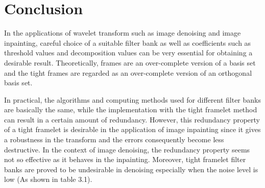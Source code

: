 
\chapter{Conclusion} %

\label{SectionX} %



In the applications of wavelet transform such as image denoising and image inpainting, careful choice of a suitable filter bank as well as coefficients such as threshold values and decomposition values can be very essential for obtaining a desirable result. Theoretically, frames are an over-complete version of a basis set and the tight frames are regarded as an over-complete version of an orthogonal basis set. 

In practical, the algorithms and computing methods used for different filter banks are basically the same, while the implementation with the tight framelet method can result in a certain amount of redundancy. However, this redundancy property of a tight framelet is desirable in the application of image inpainting since it gives a robustness in the transform and the errors consequently become less destructive. In the context of image denoising, the redundancy property seems not so effective as it behaves in the inpainting. Moreover, tight framelet filter banks are proved to be undesirable in denoising especially when the noise level is low (As shown in table 3.1).

\vfill
